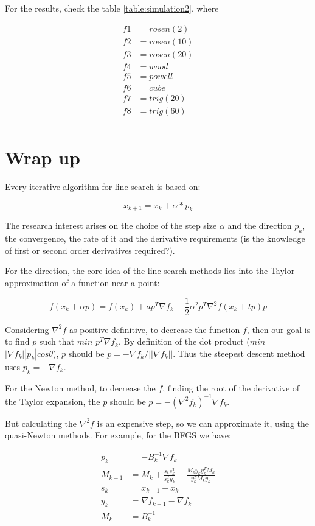 \documentclass[a4paper,11pt]{article}
\numberwithin{equation}{section} %
\begin{document}
For the results, check the table \ref{table:simulation2}, where

\begin{align*}
    f1 &= rosen(2) \\
    f2 &= rosen(10) \\
    f3 &= rosen(20) \\
    f4 &= wood \\
    f5 &= powell \\
    f6 &= cube \\
    f7 &= trig(20) \\
    f8 &= trig(60) \\
\end{align*}




\section{Wrap up}

Every iterative algorithm for line search is based on:

\[x_{k+1} = x_k + \alpha*p_k\]

The research interest arises on the choice of the step size $\alpha$ and the direction $p_k$, the convergence, the rate of it and the derivative requirements (is the knowledge of first or second order derivatives required?).

For the direction,
the core idea of the line search methods lies into the Taylor approximation of a function near a point:

\[f(x_k + \alpha p) = f(x_k) + a p^T \nabla f_k + \frac{1}{2} \alpha^2 p^T \nabla^2 f(x_k + tp) p\]

Considering $\nabla^2 f$ as positive definitive, to decrease the function $f$, then our goal is to find $p$ such that
$min$ $p^T \nabla f_k$. By definition of the dot product ($min$ $|\nabla f_k| |p_k| cos \theta$), $p$ should be $p = - \nabla f_k / ||\nabla f_k||$. Thus the steepest descent method uses $p_k = - \nabla f_k$.

For the Newton method, to decrease the $f$, finding the root of the derivative of the Taylor expansion, the $p$ should be $p = - (\nabla^2 f_k) ^{-1} \nabla f_k$.

But calculating the $\nabla^2 f$ is an expensive step, so we can approximate it, using the quasi-Newton methods. For example, for the BFGS we have:

\begin{align}
    p_k &= -B_k^{-1} \nabla f_k \\
    M_{k+1} &= M_k + \frac{s_k s_k^T}{s_k^T y_k} - \frac{M_k y_k y_k^T M_k}{y_k^T M_k y_k} \\
    s_k &= x_{k+1} - x_k \\
    y_k &= \nabla f_{k+1} - \nabla f_k \\
    M_k &= B_k^{-1}
\end{align}
\end{document}
